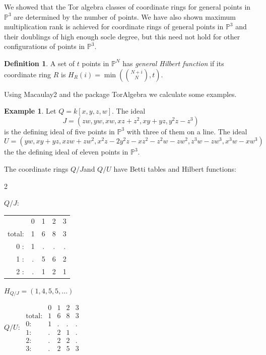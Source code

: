 \documentclass[reqno]{amsart}
\renewcommand{\P}{\mathbb{P}}
\theoremstyle{plain} %
\theoremstyle{definition}
\newtheorem{definition}[theorem]{Definition}
\newtheorem{example}[theorem]{Example}
\theoremstyle{remark}
\begin{document}
We showed that the Tor algebra classes of coordinate rings for general points in $\P^3$ are determined by the number of points. 
We have also shown maximum multiplication rank is achieved for coordinate rings of general points in $\P^3$  and their doublings of high enough socle degree, but this need not hold for other configurations of points in $\P^3$. 
\begin{definition}
    A set of $t$ points in $\P^N$ has {\it general Hilbert function} if its coordinate ring $R$ is $H_R(i)=\min({N+i\choose N},t)$.
\end{definition}

Using Macaulay2 and the package TorAlgebra \cite{TorAlgebraSource} we calculate some examples. 
\begin{example}\label{Ex: other points} Let $Q=k[x,y,z,w]$. The ideal 
\[
J=(zw,yw,xw,xz+z^2,xy+yz,y^2z-z^3)
\]
is the defining ideal of five points in $\P^3$ with three of them on a line.
The ideal \[U=(yw,xy+yz,xzw+zw^2,x^2z-2y^2z-xz^2-z^2w-zw^2,z^3w-zw^3,x^3w-xw^3)\]
the the defining ideal of eleven points in $\P^3$.

    
    The coordinate rings $Q/J$and $Q/U$ have Betti tables and Hilbert functions: 
    \begin{multicols}{2}
    
         $Q/J:\;$  \begin{tabular}{r c c c c}
      & 0 & 1 & 2 & 3 \\
    total: & 1 & 6 & 8 & 3\\
    0 : & 1 & . & . & . \\
    1 : & . & 5 & 6 & 2 \\
    2 : & . & 1 & 2 & 1 
    \end{tabular} 
    
    \vspace{10pt}
    
    $H_{Q/J}=(1,4,5,5,...)$
    
    \columnbreak
    
    $Q/U:\;\begin{matrix}
       & 0 & 1 & 2 & 3\\
      \text{total:} & 1 & 6 & 8 & 3\\
      0: & 1 & . & . & .\\
      1: & . & 2 & 1 & .\\
      2: & . & 2 & 2 & .\\
      3: & . & 2 & 5 & 3
      \end{matrix} $
      

\end{multicols}
\end{example}
\end{document}
